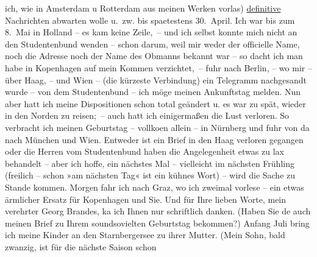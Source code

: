 \begin{ledgroupsized}[t]{13cm}
                    ich, wie in Amsterdam u Rotterdam aus meinen Werken vorlas) \uline{definitive}{ } Nachrichten abwarten wolle u. zw. bis
                    spaetestens 30. April. Ich war bis zum 8. Mai in Holland – es kam keine Zeile, – und ich
                    selbst konnte mich nicht an den Studentenbund wenden – schon darum, weil mir
                    weder der officielle Name, noch die Adresse noch der Name des Obmanns {\pb}bekannt war – so dacht ich man habe in Kopenhagen auf mein Kommen verzichtet, – fuhr
               nach Berlin, – wo mir – über Haag, – und Wien – (die
                    kürzeste Verbindung) ein Telegramm nachgesandt wurde – von dem Studentenbund –
                    ich möge meinen Ankunftstag melden. Nun aber hatt ich meine Dispositionen schon
                    total geändert u. es war zu spät, wieder in den Norden zu reisen; – auch hatt
                    ich einigermaßen die Lust verloren. So verbracht ich meinen Geburtstag –
                        vollko{\geminationm}en allein – in Nürnberg und fuhr von da nach München und Wien. Entweder
               ist ein Brief in den Haag verloren gegangen
                    oder die Herren vom Studentenbund haben die Angelegenheit etwas zu lax behandelt
                    – aber ich hoffe, ein nächstes Mal – vielleicht im nächsten Frühling (freilich –
                    schon »am nächsten Tag« ist ein kühnes Wort) – wird die Sache zu Stande kommen.
                        {\pb}Morgen fahr ich nach Graz, wo ich zweimal vorlese – ein etwas ärmlicher Ersatz
                    für Kopenhagen und Sie.\pend
           \pstart
           Und für Ihre lieben Worte, mein verehrter Georg Brandes, ka{\geminationn} ich Ihnen nur schriftlich danken. (Haben Sie
                        de{\geminationn} auch meinen Brief zu Ihrem soundsovielten
                    Geburtstag bekommen?)\pend
           \pstart
           Anfang Juli bring ich meine Kinder an den Starnbergersee zu ihrer Mutter. (Mein Sohn, bald zwanzig, ist für die nächste Saison schon

\end{ledgroupsized}
